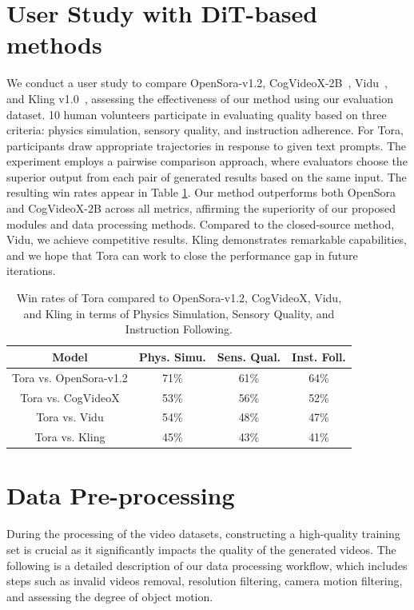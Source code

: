 \section{User Study with DiT-based methods}
We conduct a user study to compare OpenSora-v1.2, CogVideoX-2B~\cite{yang2024cogvideox}, Vidu~\cite{DBLP:journals/corr/abs-2405-04233}, and Kling v1.0~\cite{Kling}, assessing the effectiveness of our method using our evaluation dataset. 10 human volunteers participate in evaluating quality based on three criteria: physics simulation, sensory quality, and instruction adherence. For Tora, participants draw appropriate trajectories in response to given text prompts. The experiment employs a pairwise comparison approach, where evaluators choose the superior output from each pair of generated results based on the same input. The resulting win rates appear in Table \ref{sup.userstudy}. Our method outperforms both OpenSora and CogVideoX-2B across all metrics, affirming the superiority of our proposed modules and data processing methods. Compared to the closed-source method, Vidu, we achieve competitive results. Kling demonstrates remarkable capabilities, and we hope that Tora can work to close the performance gap in future iterations. 

\begin{table}[!ht]
\centering
\fontsize{8.0pt}{9.5pt}\selectfont
\begin{tabular}{cccc}
\toprule
Model          & Phys. Simu.  & Sens. Qual.  & Inst. Foll. \\ 
\midrule
Tora vs. OpenSora-v1.2 & 71\% & 61\% & 64\%     \\
Tora vs. CogVideoX  & 53\% & 56\% & 52\%     \\ 
Tora vs. Vidu  & 54\% & 48\% & 47\%     \\ 
Tora vs. Kling  & 45\% & 43\% & 41\%     \\ 
\bottomrule
\end{tabular}
\caption{Win rates of Tora compared to OpenSora-v1.2, CogVideoX, Vidu, and Kling in terms of Physics Simulation, Sensory Quality, and Instruction Following.}
\label{sup.userstudy} 
\end{table}



\section{Data Pre-processing}\label{sup.data-proc}

During the processing of the video datasets, constructing a high-quality training set is crucial as it significantly impacts the quality of the generated videos. The following is a detailed description of our data processing workflow, which includes steps such as invalid videos removal, resolution filtering, camera motion filtering, and assessing the degree of object motion.

